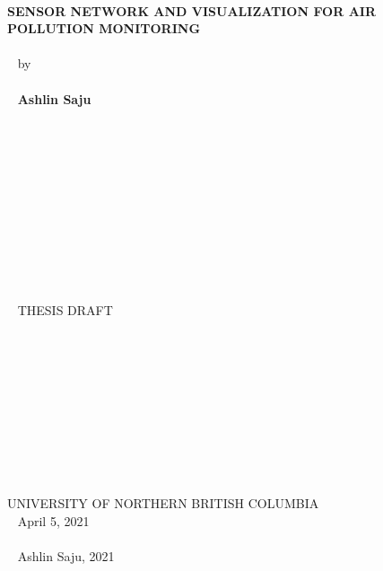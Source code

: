 \documentclass[a4paper,12pt,titlepage,oneside]{report}
\begin{document}
\begin{center}
	
	\textbf{{\textsf{\\ SENSOR NETWORK AND VISUALIZATION FOR AIR POLLUTION MONITORING}}}
	\\~
	\\~
	\textsf{by}
	\\~
	\\~
	\textbf{\textsf{Ashlin Saju}}
	\\~
	\\~
	\\~
	\\~
	\\~
	\\~
	\\~
	\\~
	\\~
	\\~
	\\~
	\\~
	\textsf{THESIS DRAFT} %
	\\~
	\\~
	\\~
	\\~
	\\~
	\\~
	\\~
	\\~
	\\~
	\\~
	\\
	\textsf{UNIVERSITY OF NORTHERN BRITISH COLUMBIA}
	\\~
	\textsf{April 5, 2021}%
	\\~
	\\~
	\textcopyright \textsf{ Ashlin Saju, 2021}

\end{center}


\end{document}
